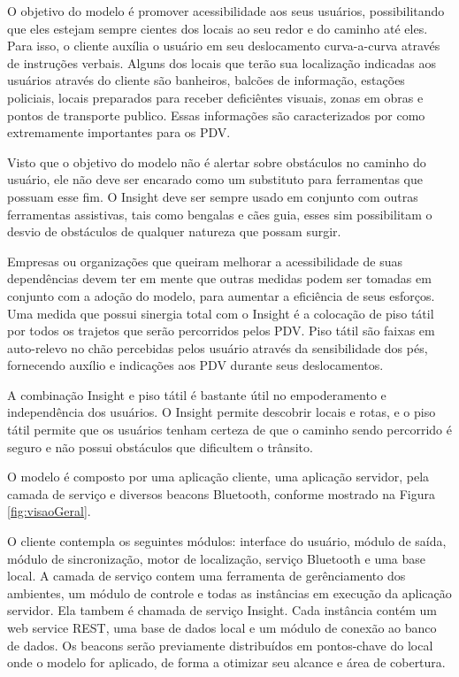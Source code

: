 \documentclass[english,brazilian]{UNISINOSmonografia}
\begin{document}
O objetivo do modelo é promover acessibilidade aos seus usuários, possibilitando que eles estejam sempre cientes dos locais ao seu redor e do caminho até eles. Para isso, o cliente auxília o usuário em seu deslocamento curva-a-curva através de instruções verbais. Alguns dos locais que terão sua localização indicadas aos usuários através do cliente são banheiros, balcões de informação, estações policiais, locais preparados para receber deficiêntes visuais, zonas em obras e pontos de transporte publico. Essas informações são caracterizados por  como extremamente importantes para os PDV.

Visto que o objetivo do modelo não é alertar sobre obstáculos no caminho do usuário, ele não deve ser encarado como um substituto para ferramentas que possuam esse fim. O Insight deve ser sempre usado em conjunto com outras ferramentas assistivas, tais como bengalas e cães guia, esses sim possibilitam o desvio de obstáculos de qualquer natureza que possam surgir. 

Empresas ou organizações que queiram melhorar a acessibilidade de suas dependências devem ter em mente que outras medidas podem ser tomadas em conjunto com a adoção do modelo, para aumentar a eficiência de seus esforços. Uma medida que possui sinergia total com o Insight é a colocação de piso tátil por todos os trajetos que serão percorridos pelos PDV. Piso tátil são faixas em auto-relevo no chão percebidas pelos usuário através da sensibilidade dos pés, fornecendo auxílio e indicações aos PDV durante seus deslocamentos.

A combinação Insight e piso tátil é bastante útil no empoderamento e independência dos usuários. O Insight permite descobrir locais e rotas, e o piso tátil permite que os usuários tenham certeza de que o caminho sendo percorrido é seguro e não possui obstáculos que dificultem o trânsito.

O modelo é composto por uma aplicação cliente, uma aplicação servidor, pela camada de serviço e diversos beacons Bluetooth, conforme mostrado na Figura \ref{fig:visaoGeral}. 

O cliente contempla os seguintes módulos: interface do usuário, módulo de saída, módulo de sincronização, motor de localização, serviço Bluetooth e uma base local. 
A camada de serviço contem uma ferramenta de gerênciamento dos ambientes, um módulo de controle e todas as instâncias em execução da aplicação servidor. Ela tambem é chamada de serviço Insight.
Cada instância contém um web service REST, uma base de dados local e um módulo de conexão ao banco de dados. 
Os beacons serão previamente distribuídos em pontos-chave do local onde o modelo for aplicado, de forma a otimizar seu alcance e área de cobertura.
\end{document}
